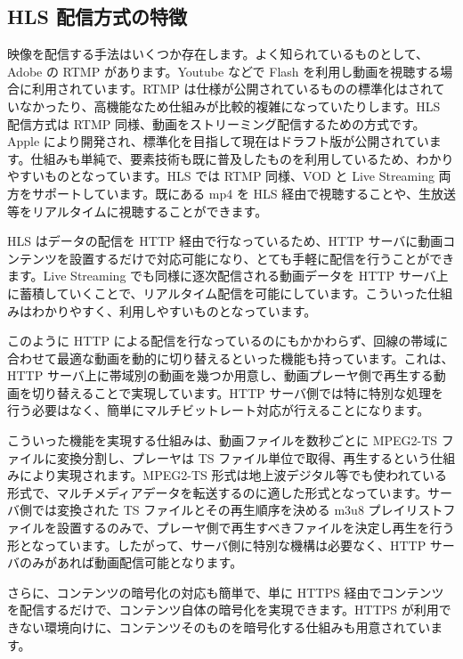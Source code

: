 \subsection{HLS 配信方式の特徴}
 映像を配信する手法はいくつか存在します。よく知られているものとして、Adobe の RTMP があります。Youtube などで Flash を利用し動画を視聴する場合に利用されています。RTMP は仕様が公開されているものの標準化はされていなかったり、高機能なため仕組みが比較的複雑になっていたりします。HLS 配信方式は RTMP 同様、動画をストリーミング配信するための方式です。Apple により開発され、標準化を目指して現在はドラフト版が公開されています。仕組みも単純で、要素技術も既に普及したものを利用しているため、わかりやすいものとなっています。HLS では RTMP 同様、VOD と Live Streaming 両方をサポートしています。既にある mp4 を HLS 経由で視聴することや、生放送等をリアルタイムに視聴することができます。

 HLS はデータの配信を HTTP 経由で行なっているため、HTTP サーバに動画コンテンツを設置するだけで対応可能になり、とても手軽に配信を行うことができます。Live Streaming でも同様に逐次配信される動画データを HTTP サーバ上に蓄積していくことで、リアルタイム配信を可能にしています。こういった仕組みはわかりやすく、利用しやすいものとなっています。

 このように HTTP による配信を行なっているのにもかかわらず、回線の帯域に合わせて最適な動画を動的に切り替えるといった機能も持っています。これは、HTTP サーバ上に帯域別の動画を幾つか用意し、動画プレーヤ側で再生する動画を切り替えることで実現しています。HTTP サーバ側では特に特別な処理を行う必要はなく、簡単にマルチビットレート対応が行えることになります。

 こういった機能を実現する仕組みは、動画ファイルを数秒ごとに MPEG2-TS ファイルに変換分割し、プレーヤは TS ファイル単位で取得、再生するという仕組みにより実現されます。MPEG2-TS 形式は地上波デジタル等でも使われている形式で、マルチメディアデータを転送するのに適した形式となっています。サーバ側では変換された TS ファイルとその再生順序を決める m3u8 プレイリストファイルを設置するのみで、プレーヤ側で再生すべきファイルを決定し再生を行う形となっています。したがって、サーバ側に特別な機構は必要なく、HTTP サーバのみがあれば動画配信可能となります。

 さらに、コンテンツの暗号化の対応も簡単で、単に HTTPS 経由でコンテンツを配信するだけで、コンテンツ自体の暗号化を実現できます。HTTPS が利用できない環境向けに、コンテンツそのものを暗号化する仕組みも用意されています。

